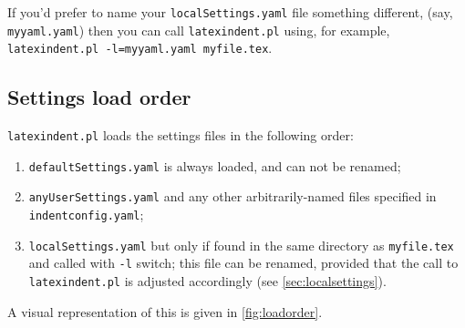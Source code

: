 \documentclass[11pt]{article}
\begin{document}
If you'd prefer to name your \lstinline!localSettings.yaml! file something different, (say, \lstinline!myyaml.yaml!) then
you can call \lstinline!latexindent.pl! using, for example, \lstinline[breaklines=true]!latexindent.pl -l=myyaml.yaml myfile.tex!.

\subsection{Settings load order}\label{sec:loadorder}
\lstinline!latexindent.pl! loads the settings files in the following order:
\begin{enumerate}
	\item \lstinline!defaultSettings.yaml! is always loaded, and can not be renamed;
	\item \lstinline!anyUserSettings.yaml! and any other arbitrarily-named files specified in \lstinline!indentconfig.yaml!;
	\item \lstinline!localSettings.yaml! but only if found in the same directory as \lstinline!myfile.tex! and called
	      with \lstinline!-l! switch; this file can be renamed, provided that the call to \lstinline!latexindent.pl! is adjusted 
          accordingly (see \cref{sec:localsettings}).
\end{enumerate}
A visual representation of this is given in \cref{fig:loadorder}.
\end{document}
